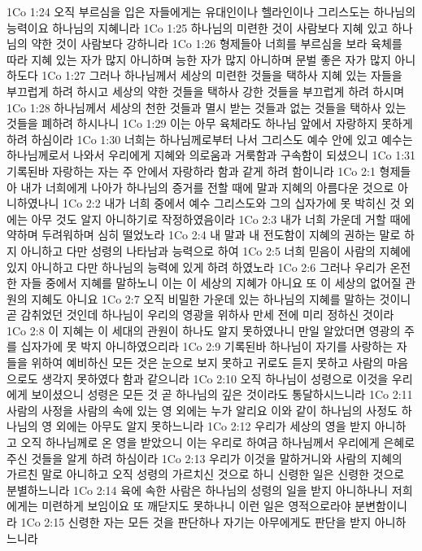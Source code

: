 1Co 1:24  오직 부르심을 입은 자들에게는 유대인이나 헬라인이나 그리스도는 하나님의 능력이요 하나님의 지혜니라
1Co 1:25  하나님의 미련한 것이 사람보다 지혜 있고 하나님의 약한 것이 사람보다 강하니라
1Co 1:26  형제들아 너희를 부르심을 보라 육체를 따라 지혜 있는 자가 많지 아니하며 능한 자가 많지 아니하며 문벌 좋은 자가 많지 아니하도다
1Co 1:27  그러나 하나님께서 세상의 미련한 것들을 택하사 지혜 있는 자들을 부끄럽게 하려 하시고 세상의 약한 것들을 택하사 강한 것들을 부끄럽게 하려 하시며
1Co 1:28  하나님께서 세상의 천한 것들과 멸시 받는 것들과 없는 것들을 택하사 있는 것들을 폐하려 하시나니
1Co 1:29  이는 아무 육체라도 하나님 앞에서 자랑하지 못하게 하려 하심이라
1Co 1:30  너희는 하나님께로부터 나서 그리스도 예수 안에 있고 예수는 하나님께로서 나와서 우리에게 지혜와 의로움과 거룩함과 구속함이 되셨으니
1Co 1:31  기록된바 자랑하는 자는 주 안에서 자랑하라 함과 같게 하려 함이니라
1Co 2:1  형제들아 내가 너희에게 나아가 하나님의 증거를 전할 때에 말과 지혜의 아름다운 것으로 아니하였나니
1Co 2:2  내가 너희 중에서 예수 그리스도와 그의 십자가에 못 박히신 것 외에는 아무 것도 알지 아니하기로 작정하였음이라
1Co 2:3  내가 너희 가운데 거할 때에 약하며 두려워하며 심히 떨었노라
1Co 2:4  내 말과 내 전도함이 지혜의 권하는 말로 하지 아니하고 다만 성령의 나타남과 능력으로 하여
1Co 2:5  너희 믿음이 사람의 지혜에 있지 아니하고 다만 하나님의 능력에 있게 하려 하였노라
1Co 2:6  그러나 우리가 온전한 자들 중에서 지혜를 말하노니 이는 이 세상의 지혜가 아니요 또 이 세상의 없어질 관원의 지혜도 아니요
1Co 2:7  오직 비밀한 가운데 있는 하나님의 지혜를 말하는 것이니 곧 감취었던 것인데 하나님이 우리의 영광을 위하사 만세 전에 미리 정하신 것이라
1Co 2:8  이 지혜는 이 세대의 관원이 하나도 알지 못하였나니 만일 알았더면 영광의 주를 십자가에 못 박지 아니하였으리라
1Co 2:9  기록된바 하나님이 자기를 사랑하는 자들을 위하여 예비하신 모든 것은 눈으로 보지 못하고 귀로도 듣지 못하고 사람의 마음으로도 생각지 못하였다 함과 같으니라
1Co 2:10  오직 하나님이 성령으로 이것을 우리에게 보이셨으니 성령은 모든 것 곧 하나님의 깊은 것이라도 통달하시느니라
1Co 2:11  사람의 사정을 사람의 속에 있는 영 외에는 누가 알리요 이와 같이 하나님의 사정도 하나님의 영 외에는 아무도 알지 못하느니라
1Co 2:12  우리가 세상의 영을 받지 아니하고 오직 하나님께로 온 영을 받았으니 이는 우리로 하여금 하나님께서 우리에게 은혜로 주신 것들을 알게 하려 하심이라
1Co 2:13  우리가 이것을 말하거니와 사람의 지혜의 가르친 말로 아니하고 오직 성령의 가르치신 것으로 하니 신령한 일은 신령한 것으로 분별하느니라
1Co 2:14  육에 속한 사람은 하나님의 성령의 일을 받지 아니하나니 저희에게는 미련하게 보임이요 또 깨닫지도 못하나니 이런 일은 영적으로라야 분변함이니라
1Co 2:15  신령한 자는 모든 것을 판단하나 자기는 아무에게도 판단을 받지 아니하느니라
